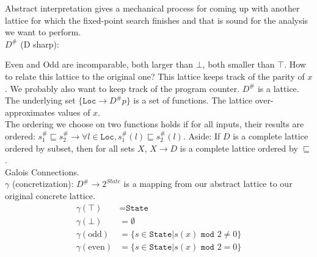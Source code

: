 \documentclass[11pt]{article}
\theoremstyle{definition}
\theoremstyle{plain}
\newcommand{\bottom}{\bot}
\begin{document}
\noindent Abstract interpretation gives a mechanical process for coming up with another lattice for which the fixed-point search finishes and 
that is sound for the analysis we want to perform.\\


\noindent $D^\#$ (D sharp):

\begin{center}
\end{center}


\noindent Even and Odd are incomparable, both larger than $\bottom$, both smaller than $\top$. 
How to relate this lattice to the original one? This lattice keeps track of the parity of $x$. 
We probably also want to keep track of the program counter. $D^\#$ is a lattice. 
The underlying set $\{\texttt{Loc} \rightarrow D^\#p\}$ is a set of functions. The lattice over-approximates values of $x$.\\

\noindent The ordering we choose on two functions holds if for all inputs, their results are ordered:
$s^\#_1 \sqsubseteq s^\#_2 \rightarrow \forall l \in \texttt{Loc}, s^\#_1(l) \sqsubseteq s^\#_2(l)$.
Aside: If $D$ is a complete lattice ordered by subset, then for all sets $X$, $X \rightarrow D$ 
is a complete lattice ordered by $\sqsubseteq$.\\

\noindent Galois Connections.\\

\noindent $\gamma$ (concretization): $D^\# \rightarrow 2^{State}$ is a mapping from our abstract lattice to our original concrete lattice.
\begin{align*}
    \gamma(\top) &= \texttt{State}\\
    \gamma(\bottom) &= \emptyset\\
    \gamma(\textrm{odd}) &= \{s \in \texttt{State}  | s(x) \texttt{ mod }2 \neq 0\}\\
    \gamma(\textrm{even}) &= \{s \in \texttt{State} | s(x) \texttt{ mod }2 = 0 \}
\end{align*}
\end{document}
